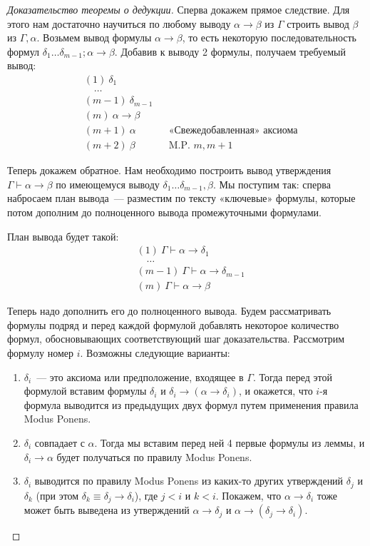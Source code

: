 \documentclass[a4paper,11pt]{article}
\theoremstyle{definition}
\newcommand{\proves}{\vdash}
\begin{document}
\begin{proof}[Доказательство теоремы о дедукции]
Сперва докажем прямое следствие. Для этого нам достаточно научиться по любому
выводу $\alpha \to \beta$ из $\Gamma$ строить вывод $\beta$ из $\Gamma, \alpha$.
Возьмем вывод формулы $\alpha \to \beta$, то есть некоторую последовательность
формул $\delta_1 \dots \delta_{m-1}; \alpha \to \beta$. Добавив к выводу 2
формулы, получаем требуемый вывод:
\begin{align*}
&(1)\ \delta_1\\
&\quad\dots\\
&(m-1)\ \delta_{m-1}\\
&(m)\ \alpha \to \beta\\
&(m+1)\ \alpha &&\text{«Свежедобавленная» аксиома}\\
&(m+2)\ \beta &&\text{M.P. } m, m+1
\end{align*}

Теперь докажем обратное. Нам необходимо построить вывод утверждения
$\Gamma \proves \alpha \to \beta$ по имеющемуся выводу
$\delta_1 \dots \delta_{m-1}, \beta$. Мы поступим так: сперва набросаем план
вывода~--- разместим по тексту «ключевые» формулы, которые потом дополним до
полноценного вывода промежуточными формулами.

План вывода будет такой:
\begin{align*}
&(1)\ \Gamma \proves \alpha \to \delta_1\\
&\quad\dots\\
&(m-1)\ \Gamma \proves \alpha \to \delta_{m-1}\\
&(m)\ \Gamma \proves \alpha \to \beta
\end{align*}

Теперь надо дополнить его до полноценного вывода. Будем рассматривать формулы
подряд и перед каждой формулой добавлять некоторое количество формул,
обосновывающих соответствующий шаг доказательства. Рассмотрим формулу номер $i$.
Возможны следующие варианты:
\begin{enumerate}
\item $\delta_i$~--- это аксиома или предположение, входящее в $\Gamma$. Тогда
  перед этой формулой вставим формулы $\delta_i$ и
  $\delta_i \to (\alpha \to \delta_i)$, и окажется, что $i$-я формула выводится
  из предыдущих двух формул путем применения правила Modus Ponens.
\item $\delta_i$ совпадает с $\alpha$. Тогда мы вставим перед ней 4 первые
  формулы из леммы, и $\delta_i \to \alpha$ будет получаться по правилу Modus
  Ponens.
\item $\delta_i$ выводится по правилу Modus Ponens из каких-то других
  утверждений $\delta_j$ и $\delta_k$ (при этом $\delta_k \equiv \delta_j \to
  \delta_i$), где $j < i$ и $k < i$. Покажем, что $\alpha \to \delta_i$ тоже
  может быть выведена из утверждений $\alpha \to \delta_j$ и $\alpha \to
  (\delta_j \to \delta_i)$.


\end{enumerate}
\end{proof}
\end{document}
